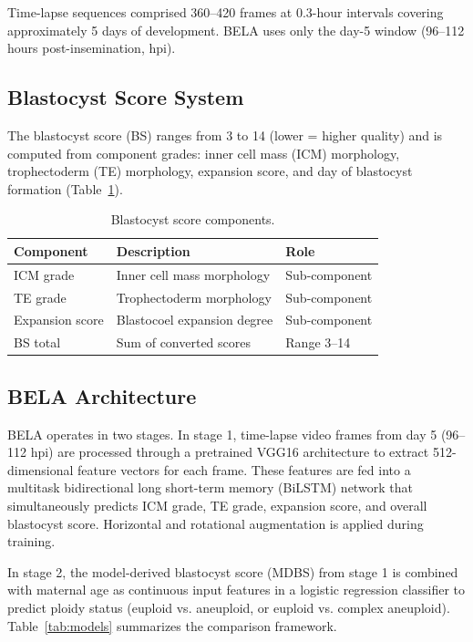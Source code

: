 \documentclass[11pt]{article}
\begin{document}
Time-lapse sequences comprised 360--420 frames at 0.3-hour intervals covering approximately 5 days of development. BELA uses only the day-5 window (96--112 hours post-insemination, hpi).

\subsection{Blastocyst Score System}

The blastocyst score (BS) ranges from 3 to 14 (lower = higher quality) and is computed from component grades: inner cell mass (ICM) morphology, trophectoderm (TE) morphology, expansion score, and day of blastocyst formation (Table~\ref{tab:scores}).

\begin{table}[htbp]
\centering
\caption{Blastocyst score components.}
\label{tab:scores}
\begin{tabular}{lll}
\toprule
Component & Description & Role \\
\midrule
ICM grade & Inner cell mass morphology & Sub-component \\
TE grade & Trophectoderm morphology & Sub-component \\
Expansion score & Blastocoel expansion degree & Sub-component \\
BS total & Sum of converted scores & Range 3--14 \\
\bottomrule
\end{tabular}
\end{table}

\subsection{BELA Architecture}

BELA operates in two stages. In stage 1, time-lapse video frames from day 5 (96--112 hpi) are processed through a pretrained VGG16 architecture to extract 512-dimensional feature vectors for each frame. These features are fed into a multitask bidirectional long short-term memory (BiLSTM) network that simultaneously predicts ICM grade, TE grade, expansion score, and overall blastocyst score. Horizontal and rotational augmentation is applied during training.

In stage 2, the model-derived blastocyst score (MDBS) from stage 1 is combined with maternal age as continuous input features in a logistic regression classifier to predict ploidy status (euploid vs. aneuploid, or euploid vs. complex aneuploid). Table~\ref{tab:models} summarizes the comparison framework.
\end{document}
